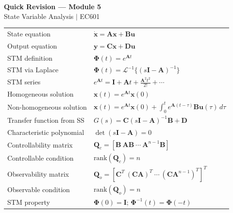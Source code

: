 \documentclass[12pt,a4paper]{article}
\begin{document}
\newpage
\begin{center}
  {\large\bfseries\color{myred} Quick Revision --- Module 5}\\[3pt]
  {\small\color{mydark} State Variable Analysis $|$ EC601}
\end{center}
\noindent{\color{myred}\rule{\linewidth}{1.2pt}}
\vspace{4pt}

\begin{tcolorbox}[formulabox, title={\textbf{Key Formulas at a Glance}}]
\begin{tabularx}{\linewidth}{B{5.2cm} X}
State equation              & $\dot{\mathbf{x}} = \mathbf{A}\mathbf{x} + \mathbf{B}\mathbf{u}$ \\[2pt]
Output equation             & $\mathbf{y} = \mathbf{C}\mathbf{x} + \mathbf{D}\mathbf{u}$ \\[2pt]
STM definition              & $\boldsymbol{\Phi}(t) = e^{\mathbf{A}t}$ \\[2pt]
STM via Laplace             & $\boldsymbol{\Phi}(t) = \mathcal{L}^{-1}\{(s\mathbf{I}-\mathbf{A})^{-1}\}$ \\[2pt]
STM series                  & $e^{\mathbf{A}t} = \mathbf{I} + \mathbf{A}t + \frac{\mathbf{A}^2t^2}{2!} + \cdots$ \\[2pt]
Homogeneous solution        & $\mathbf{x}(t) = e^{\mathbf{A}t}\mathbf{x}(0)$ \\[2pt]
Non-homogeneous solution    & $\mathbf{x}(t) = e^{\mathbf{A}t}\mathbf{x}(0) + \int_0^t e^{\mathbf{A}(t-\tau)}\mathbf{B}\mathbf{u}(\tau)\,d\tau$ \\[2pt]
Transfer function from SS   & $G(s) = \mathbf{C}(s\mathbf{I}-\mathbf{A})^{-1}\mathbf{B} + \mathbf{D}$ \\[2pt]
Characteristic polynomial   & $\det(s\mathbf{I}-\mathbf{A}) = 0$ \\[2pt]
Controllability matrix      & $\mathbf{Q}_c = [\mathbf{B}\ \mathbf{A}\mathbf{B}\ \cdots\ \mathbf{A}^{n-1}\mathbf{B}]$ \\[2pt]
Controllable condition      & $\text{rank}(\mathbf{Q}_c) = n$ \\[2pt]
Observability matrix        & $\mathbf{Q}_o = [\mathbf{C}^T\ (\mathbf{C}\mathbf{A})^T\ \cdots\ (\mathbf{C}\mathbf{A}^{n-1})^T]^T$ \\[2pt]
Observable condition        & $\text{rank}(\mathbf{Q}_o) = n$ \\[2pt]
STM property                & $\boldsymbol{\Phi}(0) = \mathbf{I}$; $\boldsymbol{\Phi}^{-1}(t) = \boldsymbol{\Phi}(-t)$
\end{tabularx}
\end{tcolorbox}
\end{document}
